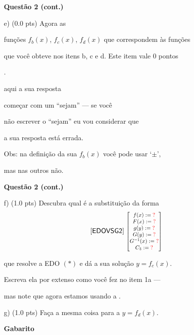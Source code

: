 \documentclass[oneside,12pt]{article}
\begin{document}
{\bf Questão 2 (cont.)}

\msk

e) \B(0.0 pts) Agora  as

funções $f_b(x)$, $f_c(x)$, $f_d(x)$ que correspondem às funções

que você obteve nos itens b, c e d. Este item vale 0 pontos

.

\bsk

 aqui a sua resposta

 começar com um ``sejam'' --- se você

não escrever o ``sejam'' eu vou considerar que

a sua resposta está errada.

\bsk

Obs: na definição da sua $f_b(x)$ você pode usar `$\pm$',

mas nas outros não.


\newpage

{\bf Questão 2 (cont.)}

\msk

f) \B(1.0 pts) Descubra qual é a substituição da forma
%
$$\pfo{EDOVSG2} \;
    \scalebox{0.8}{$
    \bmat{
    f(x) := \Rdq \\
    F(x) := \Rdq \\
    g(y) := \Rdq \\
    G(y) := \Rdq \\
    G^{-1}(x) := \Rdq \\
    C_3 := \Rdq \\
    }
    $}
$$

que resolve a EDO $(*)$ e dá a sua solução $y=f_c(x)$.

Escreva ela por extenso como você fez no item 1a ---

mas note que agora estamos usando a .

\msk


g) \B(1.0 pts) Faça a mesma coisa para a $y=f_d(x)$.


\newpage


\thispagestyle{empty}

\begin{center}

\vspace*{2.0cm}

{\bf \Large Gabarito}

\end{center}
\end{document}
